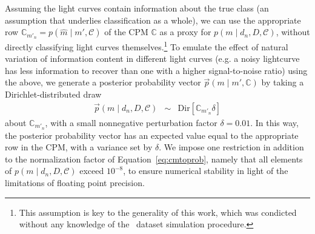 Assuming the light curves contain information about the true class (an assumption that underlies classification as a whole), we can use the appropriate row $\mathbb{C}_{m'_{n}} = p(\hat{m} \mid m', \mathcal{C})$ of the CPM $\mathbb{C}$ as a proxy for $p(m \mid d_{n}, D, \mathcal{C})$, without directly classifying light curves themselves.\footnote{This assumption is key to the generality of this work, which was condicted without any knowledge of the \plasticc\ dataset simulation procedure.}
To emulate the effect of natural variation of information content in different light curves (e.g. a noisy lightcurve has less information to recover than one with a higher signal-to-noise ratio) using the above, we generate a posterior probability vector $\vec{p}(m \mid m', \mathbb{C})$ by taking a Dirichlet-distributed draw
\begin{eqnarray}
  \label{eq:cmtoprob}
  \vec{p}(m \mid d_{n}, D, \mathcal{C}) &\sim& \mathrm{Dir}[\mathbb{C}_{m'_{n}} \delta]
\end{eqnarray}
about $\mathbb{C}_{m'_{n}}$, with a small nonnegative perturbation factor $\delta = 0.01$.
In this way, the posterior probability vector has an expected value equal to the appropriate row in the CPM, with a variance set by $\delta$.
We impose one restriction in addition to the normalization factor of Equation~\ref{eq:cmtoprob}, namely that all elements of $p(m \mid d_{n}, D, \mathcal{C})$ exceed $10^{-8}$, to ensure numerical stability in light of the limitations of floating point precision.


